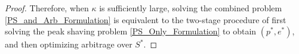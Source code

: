 \documentclass[conference]{IEEEtran}
\newtheorem{proposition}[theorem]{\textbf{Proposition}}
\begin{document}
\begin{proof}
Therefore, when $\kappa$ is sufficiently large, solving the combined problem \eqref{PS_and_Arb_Formulation} is equivalent to the two-stage procedure of first solving the peak shaving problem \eqref{PS_Only_Formulation} to obtain $(p^*,e^*)$, and then optimizing arbitrage over $S^*$.  \end{proof}








\end{document}
